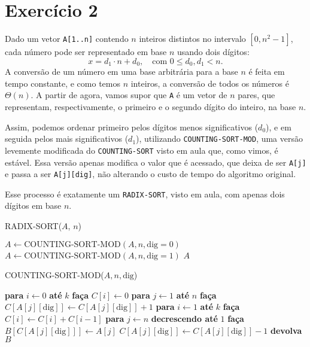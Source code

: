 \documentclass[a4paper,12pt]{article}
\begin{document}
\section*{Exercício 2}

Dado um vetor \texttt{A[1..n]} contendo $n$ inteiros distintos no intervalo $[0, n^2 - 1]$, cada número pode ser representado em base $n$ usando dois dígitos:
\[ x = d_1 \cdot n + d_0, \quad \text{com } 0 \leq d_0, d_1 < n. \]
A conversão de um número em uma base arbitrária para a base $n$ é feita em tempo constante, e como temos $n$ inteiros, a conversão de todos os números é $\Theta(n)$. A partir de agora, vamos supor que \texttt{A} é um vetor de $n$ pares, que representam, respectivamente, o primeiro e o segundo dígito do inteiro, na base $n$.

Assim, podemos ordenar primeiro pelos dígitos menos significativos ($d_0$), e em seguida pelos mais significativos ($d_1$), utilizando \texttt{COUNTING-SORT-MOD}, uma versão levemente modificada do \texttt{COUNTING-SORT} visto em aula que, como vimos, é estável. Essa versão apenas modifica o valor que é acessado, que deixa de ser \texttt{A[j]} e passa a ser \texttt{A[j][dig]}, não alterando o custo de tempo do algoritmo original.

Esse processo é exatamente um \texttt{RADIX-SORT}, visto em aula, com apenas dois dígitos em base $n$.

\begin{algorithm}
	\caption{RADIX-SORT($A$, $n$)}
	\begin{algorithmic}[1]
		\STATE $A \gets \text{COUNTING-SORT-MOD}(A, n, \text{dig}=0)$
		\STATE $A \gets \text{COUNTING-SORT-MOD}(A, n, \text{dig}=1)$
		\RETURN $A$
	\end{algorithmic}
\end{algorithm}

\begin{algorithm}[hbt!]
	\caption{COUNTING-SORT-MOD($A, n, \text{dig}$)}
	\begin{algorithmic}[1]
		\STATE \textbf{para} $i \gets 0$ \textbf{até} $k$ \textbf{faça}
		\STATE \hspace{0.5cm} $C[i] \gets 0$
		\STATE \textbf{para} $j \gets 1$ \textbf{até} $n$ \textbf{faça}
		\STATE \hspace{0.5cm} $C[A[j][\text{dig}]] \gets C[A[j][\text{dig}]] + 1$
		\STATE \textbf{para} $i \gets 1$ \textbf{até} $k$ \textbf{faça}
		\STATE \hspace{0.5cm} $C[i] \gets C[i] + C[i-1]$
		\STATE \textbf{para} $j \gets n$ \textbf{decrescendo até} $1$ \textbf{faça}
		\STATE \hspace{0.5cm} $B[C[A[j][\text{dig}]]] \gets A[j]$
		\STATE \hspace{0.5cm} $C[A[j][\text{dig}]] \gets C[A[j][\text{dig}]] - 1$
		\STATE \textbf{devolva} $B$
	\end{algorithmic}
\end{algorithm}
\end{document}
